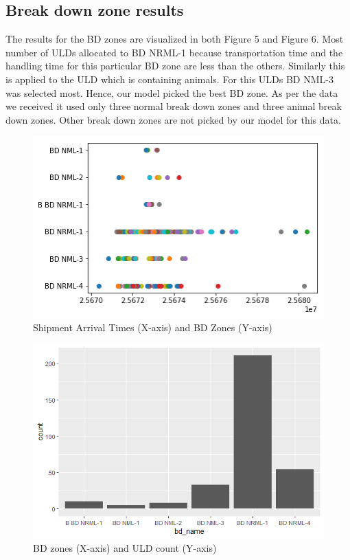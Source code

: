 \documentclass[11pt,a4paper,fleqn]{article}
\begin{document}
\subsection{Break down zone results}
\label{sec:fmBDResults}
The results for the BD zones are visualized in both Figure 5 and Figure 6. Most number of ULDs allocated to BD NRML-1 because transportation time and the handling time for this particular BD zone are less than the others. Similarly this is applied to the ULD which is containing animals. For this ULDs BD NML-3 was selected most. Hence, our model picked the best BD zone. As per the data we received it used only three normal break down zones and three animal break down zones. Other break down zones are not picked by our model for this data. 


\begin{figure}[hbt!]
	\centering
	\includegraphics[width=150mm,scale=1.0]{bd_assignment.png}
	\caption{Shipment Arrival Times (X-axis) and BD Zones (Y-axis)}
	\label{fig:Shipment Arrival Times (X-axis) and BD Zones (Y-axis)}
\end{figure}

\begin{figure}[hbt!]
	\centering
	\includegraphics[width=150mm,scale=1.0]{Rplot_bd.png}
	\caption{BD zones (X-axis) and ULD count (Y-axis)}
	\label{fig:BD zones (X-axis) and ULD count (Y-axis)}
\end{figure}
\end{document}
